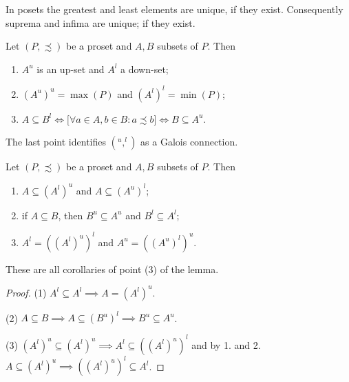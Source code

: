 \begin{lemma}
In posets the greatest and least elements are unique, if they exist. Consequently suprema and infima are unique; if they exist.
\end{lemma}

\begin{lemma}
Let $(P,\precsim)$ be a proset and $A,B$ subsets of $P$. Then
\begin{enumerate}
\item $A^u$ is an up-set and $A^l$ a down-set;
\item $(A^u)^u = \max(P)$ and $(A^l)^l = \min(P)$;
\item $A\subseteq B^l \iff \Big[\forall a\in A, b\in B: a\precsim b \Big] \iff B\subseteq A^u$.
\end{enumerate}
\end{lemma}
The last point identifies $(^u,^l)$ as a Galois connection.
\begin{corollary}
Let $(P,\precsim)$ be a proset and $A,B$ subsets of $P$. Then
\begin{enumerate}
\item $A\subseteq (A^l)^u$ and $A\subseteq (A^u)^l$;
\item if $A\subseteq B$, then $B^u\subseteq A^u$ and $B^l \subseteq A^l$;
\item $A^l = ((A^l)^u)^l$ and $A^u = ((A^u)^l)^u$.
\end{enumerate}
\end{corollary}
These are all corollaries of point (3) of the lemma.
\begin{proof}
(1) $A^l \subseteq A^l \implies A = (A^l)^u$.

(2) $A\subseteq B \implies A \subseteq (B^u)^l \implies B^u\subseteq A^u$.

(3) $(A^l)^u \subseteq (A^l)^u \implies A^l \subseteq ((A^l)^u)^l$ and by 1. and 2. $A\subseteq (A^l)^u \implies ((A^l)^u)^l \subseteq A^l$.
\end{proof}


